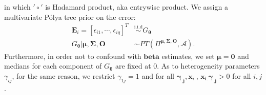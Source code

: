 \documentclass{article}
\newcommand{\polya}{P\'{o}lya}
\begin{document}
in which $'\circ'$ is Hadamard product, aka entrywise product. We
assign a multivariate \polya{} tree prior on the error:
\begin{align*}
\bm{E}_i = [\epsilon_{i1}, \cdots, \epsilon_{iq}]^T
 & \stackrel{\text{i.i.d}}{\sim} G_{\bm{\theta}} \\
G_{\bm{\theta}} | \bm{\mu, \Sigma, O} & \sim PT \left( \Pi^{\bm{\mu,
      \Sigma, O}}, \mathcal{A} \right).
\end{align*}
Furthermore, in order not to confound with $\bm{beta}$ estimates, we
set $\bm{\mu} = \bm{0}$ and medians for each component of
$G_{\bm{\theta}}$ are fixed at 0. As to heterogeneity parameters
$\gamma_{ij}$, for the same reason, we restrict $\gamma_{1j}=1$ and
for all $\bm{\gamma_{.j}}, \bm{x}_{i.}$, $\bm{x_{i.}\gamma_{.j}}>0$
for all $i,j$. 
\end{document}
